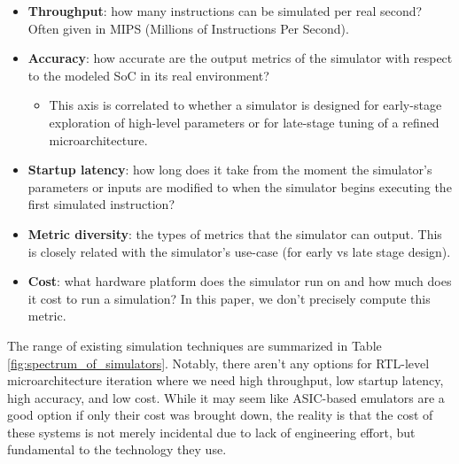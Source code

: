 \documentclass[sigplan,nonacm,10pt]{acmart}
\begin{document}
\begin{itemize}
  \item \textbf{Throughput}: how many instructions can be simulated per real second? Often given in MIPS (Millions of Instructions Per Second).
  \item \textbf{Accuracy}: how accurate are the output metrics of the simulator with respect to the modeled SoC in its real environment?
  \begin{itemize}
    \item This axis is correlated to whether a simulator is designed for early-stage exploration of high-level parameters or for late-stage tuning of a refined microarchitecture.
  \end{itemize}
  \item \textbf{Startup latency}: how long does it take from the moment the simulator's parameters or inputs are modified to when the simulator begins executing the first simulated instruction?
  \item \textbf{Metric diversity}: the types of metrics that the simulator can output. This is closely related with the simulator's use-case (for early vs late stage design).
  \item \textbf{Cost}: what hardware platform does the simulator run on and how much does it cost to run a simulation? In this paper, we don't precisely compute this metric.
\end{itemize}

The range of existing simulation techniques are summarized in Table \ref{fig:spectrum_of_simulators}.
Notably, there aren't any options for RTL-level microarchitecture iteration where we need high throughput, low startup latency, high accuracy, and low cost.
While it may seem like ASIC-based emulators are a good option if only their cost was brought down, the reality is that the cost of these systems is not merely incidental due to lack of engineering effort, but fundamental to the technology they use.
\end{document}
